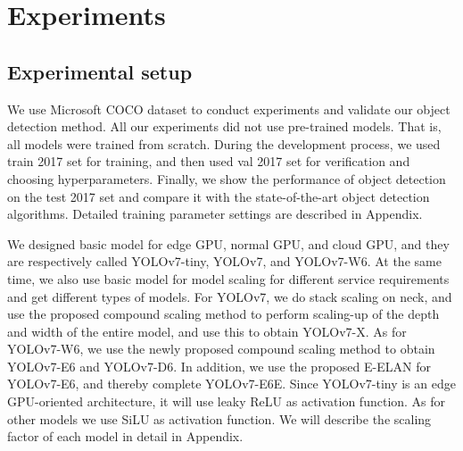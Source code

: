\documentclass[10pt,twocolumn,letterpaper]{article}
\begin{document}
\section{Experiments}
		
		
		
		\subsection{Experimental setup}
		
		We use Microsoft COCO dataset to conduct experiments and validate our object detection method. All our experiments did not use pre-trained models. That is, all models were trained from scratch. During the development process, we used train 2017 set for training, and then used val 2017 set for verification and choosing hyperparameters. Finally, we show the performance of object detection on the test 2017 set and compare it with the state-of-the-art object detection algorithms. Detailed training parameter settings are described in Appendix.
		
		We designed basic model for edge GPU, normal GPU, and cloud GPU, and they are respectively called YOLOv7-tiny, YOLOv7, and YOLOv7-W6. At the same time, we also use basic model for model scaling for different service requirements and get different types of models. For YOLOv7, we do stack scaling on neck, and use the proposed compound scaling method to perform scaling-up of the depth and width of the entire model, and use this to obtain YOLOv7-X. As for YOLOv7-W6, we use the newly proposed compound scaling method to obtain YOLOv7-E6 and YOLOv7-D6. In addition, we use the proposed E-ELAN for YOLOv7-E6, and thereby complete YOLOv7-E6E. Since YOLOv7-tiny is an edge GPU-oriented architecture, it will use leaky ReLU as activation function. As for other models we use SiLU as activation function. We will describe the scaling factor of each model in detail in Appendix.
		
		
		
\end{document}
